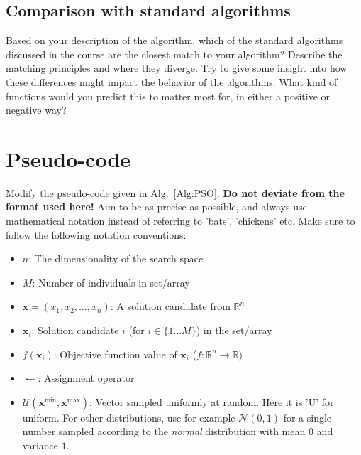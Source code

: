\documentclass[runningheads]{llncs}
\begin{document}
\subsection{Comparison with standard algorithms}
Based on your description of the algorithm, which of the standard algorithms discussed in the course are the closest match to your algorithm? Describe the matching principles and where they diverge. Try to give some insight into how these differences might impact the behavior of the algorithms. What kind of functions would you predict this to matter most for, in either a positive or negative way?


\section{Pseudo-code}\label{sec:pseudo}
Modify the pseudo-code given in Alg.~\ref{Alg:PSO}. \textbf{Do not deviate from the format used here!} Aim to be as precise as possible, and always use mathematical notation instead of referring to 'bats', 'chickens' etc. Make sure to follow the following notation conventions:
\begin{itemize}
    \item $n$: The dimensionality of the search space
    \item $M$: Number of individuals in set/array
    \item $\mathbf{x}=(x_1,x_2,\dots,x_n)$: A solution candidate from $\mathds{R}^n$
    \item $\mathbf{x}_i$: Solution candidate $i$ (for $i \in \{1\dots M\}$) in the set/array
    \item $f(\mathbf{x}_i)$: Objective function value of $\mathbf{x}_i$ ($f: \mathds{R}^n \rightarrow \mathds{R})$
    \item $\leftarrow$: Assignment operator
    \item $\bm{\mathcal{U}}(\mathbf{x}^{\text{min}},\mathbf{x}^{\text{max}} )$: Vector sampled uniformly at random. Here it is 'U' for uniform. For other distributions, use for example $\bm{\mathcal{N}}(0,1)$ for a single number sampled according to the \textit{normal} distribution with mean $0$ and variance $1$.
\end{itemize}
\end{document}
